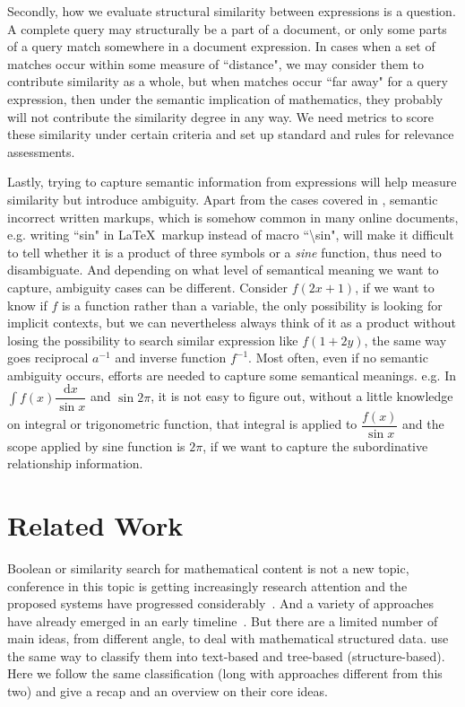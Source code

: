 Secondly, how we evaluate structural similarity between expressions is a question. A complete query may structurally be a part of a document, or only some parts of a query match somewhere in a document expression.
In cases when a set of matches occur within some measure of ``distance", we may consider them to contribute similarity as a whole, but when matches occur ``far away" for a query expression, then under the semantic implication of mathematics, they probably will not contribute the similarity degree in any way.
We need metrics to score these similarity under certain criteria and set up standard and rules for relevance assessments. 

Lastly, trying to capture semantic information from expressions will help measure similarity but introduce ambiguity. 
Apart from the cases covered in \cite{parsing_tex}, semantic incorrect written markups, which is somehow common in many online documents, e.g. writing ``sin" in \LaTeX\ markup instead of macro ``\textbackslash sin", will make it difficult to tell whether it is a product of three symbols or a \textit{sine} function, thus need to disambiguate. 
And depending on what level of semantical meaning we want to capture, ambiguity cases can be different. 
Consider $f(2x+1)$, if we want to know if $f$ is a function rather than a variable, the only possibility is looking for implicit contexts, but we can nevertheless always think of it as a product without losing the possibility to search similar expression like $f(1 + 2y)$, the same way goes reciprocal $a^{-1}$ and inverse function $f^{-1}$. 
Most often, even if no semantic ambiguity occurs, efforts are needed to capture some semantical meanings. e.g. In $\displaystyle\int f(x) \dfrac{\mathrm{d}x}{\sin x}$ and $\sin 2 \pi$, it is not easy to figure out, without a little knowledge on integral or trigonometric function, that integral is applied to $\dfrac {f(x)} {\sin x}$ and the scope applied by sine function is $2 \pi$, if we want to capture the subordinative relationship information.


\section{Related Work}
\label{relatedwork}
Boolean or similarity search for mathematical content is not a new topic, conference in this topic is getting increasingly research attention and the proposed systems have progressed considerably~\cite{ov}. 
And a variety of approaches have already emerged in an early timeline~\cite{egomath13}.
But there are a limited number of main ideas, from different angle, to deal with mathematical structured data. \cite{WikiMirs13,symbolpairs15,Youssef14} use the same way to classify them into text-based and tree-based (structure-based). Here we follow the same classification (long with approaches different from this two) and give a recap and an overview on their core ideas.

